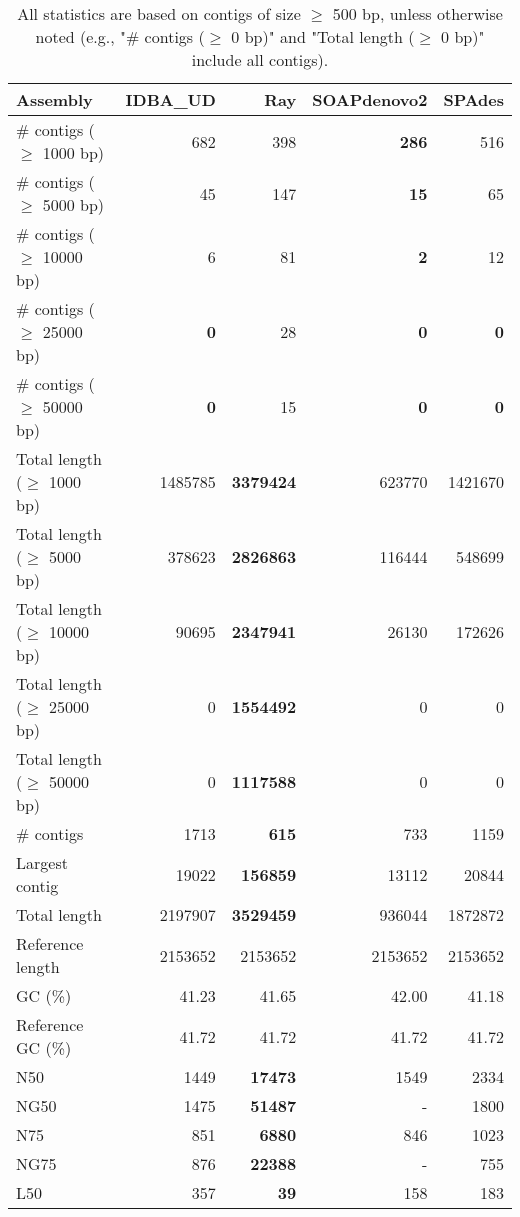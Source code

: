 \documentclass[12pt,a4paper]{article}
\begin{document}
\begin{table}[ht]
\begin{center}
\caption{All statistics are based on contigs of size $\geq$ 500 bp, unless otherwise noted (e.g., "\# contigs ($\geq$ 0 bp)" and "Total length ($\geq$ 0 bp)" include all contigs).}
\begin{tabular}{|l*{4}{|r}|}
\hline
Assembly & IDBA\_UD & Ray & SOAPdenovo2 & SPAdes \\ \hline
\# contigs ($\geq$ 1000 bp) & 682 & 398 & {\bf 286} & 516 \\ \hline
\# contigs ($\geq$ 5000 bp) & 45 & 147 & {\bf 15} & 65 \\ \hline
\# contigs ($\geq$ 10000 bp) & 6 & 81 & {\bf 2} & 12 \\ \hline
\# contigs ($\geq$ 25000 bp) & {\bf 0} & 28 & {\bf 0} & {\bf 0} \\ \hline
\# contigs ($\geq$ 50000 bp) & {\bf 0} & 15 & {\bf 0} & {\bf 0} \\ \hline
Total length ($\geq$ 1000 bp) & 1485785 & {\bf 3379424} & 623770 & 1421670 \\ \hline
Total length ($\geq$ 5000 bp) & 378623 & {\bf 2826863} & 116444 & 548699 \\ \hline
Total length ($\geq$ 10000 bp) & 90695 & {\bf 2347941} & 26130 & 172626 \\ \hline
Total length ($\geq$ 25000 bp) & 0 & {\bf 1554492} & 0 & 0 \\ \hline
Total length ($\geq$ 50000 bp) & 0 & {\bf 1117588} & 0 & 0 \\ \hline
\# contigs & 1713 & {\bf 615} & 733 & 1159 \\ \hline
Largest contig & 19022 & {\bf 156859} & 13112 & 20844 \\ \hline
Total length & 2197907 & {\bf 3529459} & 936044 & 1872872 \\ \hline
Reference length & 2153652 & 2153652 & 2153652 & 2153652 \\ \hline
GC (\%) & 41.23 & 41.65 & 42.00 & 41.18 \\ \hline
Reference GC (\%) & 41.72 & 41.72 & 41.72 & 41.72 \\ \hline
N50 & 1449 & {\bf 17473} & 1549 & 2334 \\ \hline
NG50 & 1475 & {\bf 51487} & - & 1800 \\ \hline
N75 & 851 & {\bf 6880} & 846 & 1023 \\ \hline
NG75 & 876 & {\bf 22388} & - & 755 \\ \hline
L50 & 357 & {\bf 39} & 158 & 183 \\ \hline

\end{tabular}
\end{center}
\end{table}
\end{document}
